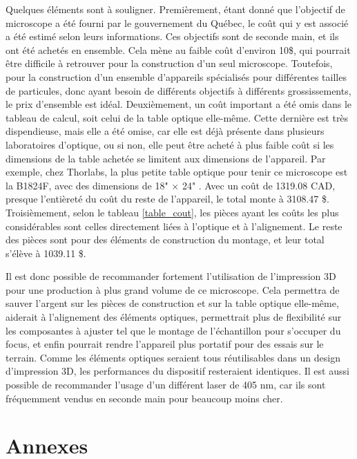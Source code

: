 \documentclass[11pt,letterpaper]{article}
\begin{document}
Quelques éléments sont à souligner. Premièrement, étant donné que l'objectif de microscope a
été fourni par le gouvernement du Québec, le coût qui y est associé a été estimé selon leurs
informations. Ces objectifs sont de seconde main, et ils ont été achetés en ensemble. Cela mène
au faible coût d'environ 10\$, qui pourrait être difficile à retrouver pour la construction d'un
seul microscope. Toutefois, pour la construction d'un ensemble d'appareils spécialisés pour
différentes tailles de particules, donc ayant besoin de différents objectifs à différents 
grossissements, le prix d'ensemble est idéal. Deuxièmement, un coût important a été omis dans 
le tableau de calcul, soit celui de la table optique elle-même. Cette dernière est très
dispendieuse, mais elle a été omise, car elle est déjà présente dans plusieurs laboratoires 
d'optique, ou si non, elle peut être acheté à plus faible coût si les dimensions de la table
achetée se limitent aux dimensions de l'appareil. Par exemple, chez Thorlabs, la plus petite 
table optique pour tenir ce microscope est la B1824F, avec des dimensions de 18" $\times$ 24" \cite{noauthor_thorlabs_2024}.
Avec un coût de 1319.08 CAD, presque l'entièreté du coût du reste de l'appareil, le total
monte à 3108.47 \$. Troisièmement, selon le tableau \ref{table_cout}, les pièces ayant les
coûts les plus considérables sont celles directement liées à l'optique et à l'alignement. Le
reste des pièces sont pour des éléments de construction du montage, et leur total s'élève à
1039.11 \$.

Il est donc possible de recommander fortement l'utilisation de l'impression 3D pour une production
à plus grand volume de ce microscope. Cela permettra de sauver l'argent sur les pièces de
construction et sur la table optique elle-même, aiderait à l'alignement des éléments optiques,
permettrait plus de flexibilité sur les composantes à ajuster tel que le montage de l'échantillon pour
s'occuper du focus, et enfin pourrait rendre l'appareil plus portatif pour des essais sur le terrain.
Comme les éléments optiques seraient tous réutilisables dans un design d'impression 3D, les
performances du dispositif resteraient identiques. Il est aussi possible de recommander l'usage
d'un différent laser de 405 nm, car ils sont fréquemment vendus en seconde main pour beaucoup moins
cher.

\section{Annexes}
\end{document}
